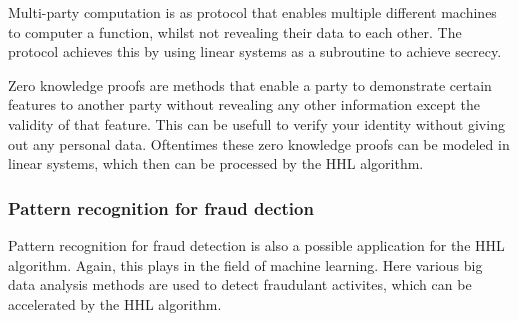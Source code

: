     Multi-party computation is as protocol that enables multiple different machines to computer a function, whilst not revealing their data to each other. 
    The protocol achieves this by using linear systems as a subroutine to achieve secrecy.

    Zero knowledge proofs are methods that enable a party to demonstrate certain features to another party without revealing any other information except the validity of that feature.
    This can be usefull to verify your identity without giving out any personal data.
    Oftentimes these zero knowledge proofs can be modeled in linear systems, which then can be processed by the HHL algorithm.

    \subsubsection{Pattern recognition for fraud dection}
    Pattern recognition for fraud detection is also a possible application for the HHL algorithm.
    Again, this plays in the field of machine learning. 
    Here various big data analysis methods are used to detect fraudulant activites, which can be accelerated by the HHL algorithm.








